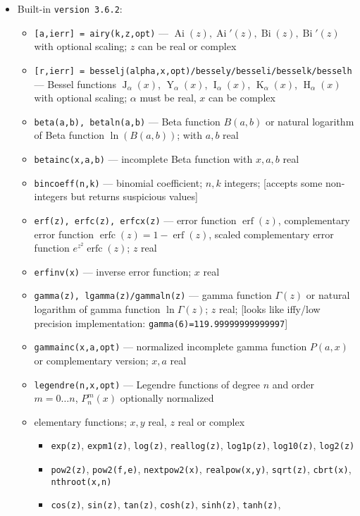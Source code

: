\documentclass[10pt,dvipdfmx,letterpaper,twoside]{article}
\let\O=\operatorname
\let\al=\alpha
\let\Gam=\Gamma
\begin{document}
\begin{itemize}
\item Built-in {\tt version 3.6.2}:
  \begin{itemize}
  \item {\tt [a,ierr] = airy(k,z,opt)} --- $\O{Ai}(z), \O{Ai}'(z), \O{Bi}(z), \O{Bi}'(z)$ with optional scaling; $z$ can be real or complex
  \item {\tt [r,ierr] = besselj(alpha,x,opt)/bessely/besseli/besselk/besselh} --- Bessel functions
      $\O{J}_\al(x)$, $\O{Y}_\al(x)$, $\O{I}_\al(x)$, $\O{K}_\al(x)$, $\O{H}_\al(x)$ with optional scaling; $\al$ must be real, $x$ can be complex
  \item {\tt beta(a,b), betaln(a,b)} --- Beta function $B(a,b)$ or natural logarithm of Beta function $\ln(B(a,b))$; with $a, b$ real
  \item {\tt betainc(x,a,b)} --- incomplete Beta function with $x, a, b$ real
  \item {\tt bincoeff(n,k)} --- binomial coefficient; $n, k$ integers;
      [accepts some non-integers but returns suspicious values]
  \item {\tt erf(z), erfc(z), erfcx(z)} --- error function $\O{erf}(z)$, complementary error function $\O{erfc}(z) = 1-\O{erf}(z)$,
      scaled complementary error function $e^{z^2}\O{erfc}(z)$; $z$ real
  \item {\tt erfinv(x)} --- inverse error function; $x$ real
  \item {\tt gamma(z), lgamma(z)/gammaln(z)} --- gamma function $\Gam(z)$ or natural logarithm of gamma function $\ln\Gam(z)$; $z$ real;
      [looks like iffy/low precision implementation: {\tt gamma(6)=119.99999999999997}]
  \item {\tt gammainc(x,a,opt)} --- normalized incomplete gamma function $P(a,x)$ or complementary version; $x, a$ real
  \item {\tt legendre(n,x,opt)} --- Legendre functions of degree $n$ and order $m=0\dots n$, $P^m_n(x)$ optionally normalized
  \item elementary functions; $x, y$ real, $z$ real or complex
    \begin{itemize}
    \item {\tt exp(z)}, {\tt expm1(z)}, {\tt log(z)}, {\tt reallog(z)}, {\tt log1p(z)}, {\tt log10(z)}, {\tt log2(z)}
    \item {\tt pow2(z)}, {\tt pow2(f,e)}, {\tt nextpow2(x)}, {\tt realpow(x,y)}, {\tt sqrt(z)}, {\tt cbrt(x)}, {\tt nthroot(x,n)}
    \item {\tt cos(z)}, {\tt sin(z)}, {\tt tan(z)}, {\tt cosh(z)}, {\tt sinh(z)}, {\tt tanh(z)},

\end{itemize}
\end{itemize}
\end{itemize}
\end{document}
